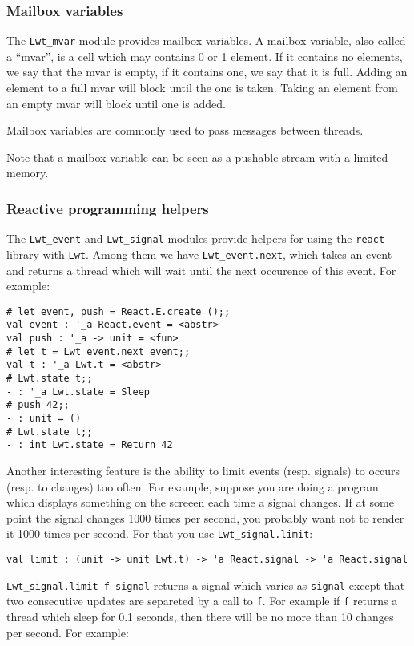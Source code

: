 \documentclass{article}
\newcommand{\lwt}{\texttt{Lwt}\xspace}
\begin{document}
\subsubsection{Mailbox variables}

The \texttt{Lwt\_mvar} module provides mailbox variables. A mailbox
variable, also called a ``mvar'', is a cell which may contains 0 or 1
element. If it contains no elements, we say that the mvar is empty,
if it contains one, we say that it is full. Adding an element to a
full mvar will block until the one is taken. Taking an element from an
empty mvar will block until one is added.

Mailbox variables are commonly used to pass messages between threads.

Note that a mailbox variable can be seen as a pushable stream with a
limited memory.

\subsubsection{Reactive programming helpers}

The \texttt{Lwt\_event} and \texttt{Lwt\_signal} modules provide
helpers for using the \texttt{react} library with \lwt. Among them we
have \texttt{Lwt\_event.next}, which takes an event and returns a
thread which will wait until the next occurence of this event. For
example:

\begin{verbatim}
# let event, push = React.E.create ();;
val event : '_a React.event = <abstr>
val push : '_a -> unit = <fun>
# let t = Lwt_event.next event;;
val t : '_a Lwt.t = <abstr>
# Lwt.state t;;
- : '_a Lwt.state = Sleep
# push 42;;
- : unit = ()
# Lwt.state t;;
- : int Lwt.state = Return 42
\end{verbatim}

Another interesting feature is the ability to limit events
(resp. signals) to occurs (resp. to changes) too often. For example,
suppose you are doing a program which displays something on the screeen
each time a signal changes. If at some point the signal changes 1000
times per second, you probably want not to render it 1000 times per
second. For that you use \texttt{Lwt\_signal.limit}:

\begin{verbatim}
val limit : (unit -> unit Lwt.t) -> 'a React.signal -> 'a React.signal
\end{verbatim}

\texttt{Lwt\_signal.limit f signal} returns a signal which varies as
\texttt{signal} except that two consecutive updates are separeted by a
call to \texttt{f}. For example if \texttt{f} returns a thread which
sleep for 0.1 seconds, then there will be no more than 10 changes per
second. For example:
\end{document}
